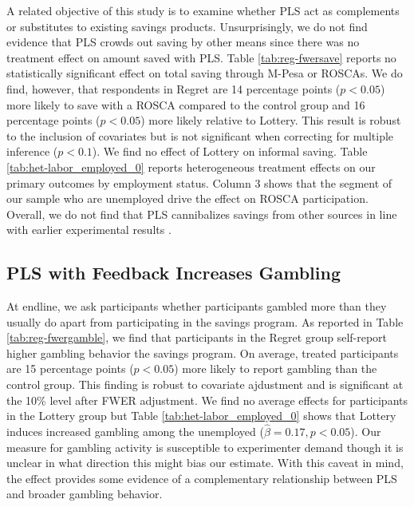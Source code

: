 \documentclass[11pt]{article}
\begin{document}
		A related objective of this study is to examine whether PLS act as complements or substitutes to existing savings products. Unsurprisingly, we do not find evidence that PLS crowds out saving by other means since there was no treatment effect on amount saved with PLS. Table \ref{tab:reg-fwersave} reports no statistically significant effect on total saving through M-Pesa or ROSCAs. We do find, however, that respondents in Regret are 14 percentage points ($p < 0.05$) more likely to save with a ROSCA compared to the control group and 16 percentage points ($p < 0.05$) more likely relative to Lottery. This result is robust to the inclusion of covariates but is not significant when correcting for multiple inference ($p < 0.1$). We find no effect of Lottery on informal saving. Table \ref{tab:het-labor_employed_0} reports heterogeneous treatment effects on our primary outcomes by employment status. Column 3 shows that the segment of our sample who are unemployed drive the effect on ROSCA participation. Overall, we do not find that PLS cannibalizes savings from other sources in line with earlier experimental results \parencite{atalay_savings_2014,filiz-ozbay_lottery_2015,dizon_leveraging_2016}.

		
		

	\subsection{PLS with Feedback Increases Gambling}

		At endline, we ask participants whether participants gambled more than they usually do apart from participating in the savings program. As reported in Table \ref{tab:reg-fwergamble}, we find that participants in the Regret group self-report higher gambling behavior the savings program. On average, treated participants are 15 percentage points ($p < 0.05$) more likely to report gambling than the control group. This finding is robust to covariate ajdustment and is significant at the 10\% level after FWER adjustment. We find no average effects for participants in the Lottery group but Table \ref{tab:het-labor_employed_0} shows that Lottery induces increased gambling among the unemployed ($\hat \beta = 0.17, p < 0.05$). Our measure for gambling activity is susceptible to experimenter demand though it is unclear in what direction this might bias our estimate. With this caveat in mind, the effect provides some evidence of a complementary relationship between PLS and broader gambling behavior.
\end{document}
